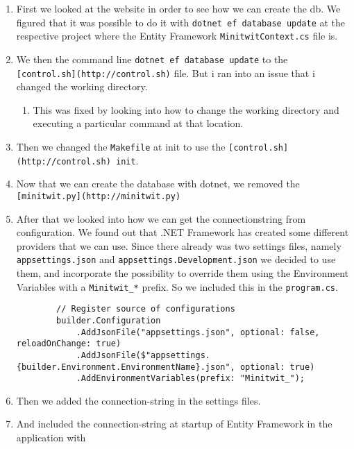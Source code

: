 \begin{enumerate}
    \item First we looked at the website in order to see how we can create the db. We figured that it was possible to do it with \texttt{dotnet\ ef\ database\ update} at the respective project where the Entity Framework \texttt{MinitwitContext.cs} file is.
    \item We then the command line \texttt{dotnet\ ef\ database\ update} to the \texttt{{[}control.sh{]}(http://control.sh)} file. But i ran into an issue that i changed the working directory.

    \begin{enumerate}
        \item This was fixed by looking into how to change the working directory and executing a particular command at that location.
    \end{enumerate}
    \item Then we changed the \texttt{Makefile} at init to use the \texttt{{[}control.sh{]}(http://control.sh)\ init}.
    \item Now that we can create the database with dotnet, we removed the \texttt{{[}minitwit.py{]}(http://minitwit.py)}
    \item After that we looked into how we can get the connectionstring from configuration. We found out that .NET Framework has created some different providers that we can use. Since there already was two settings files, namely \texttt{appsettings.json} and \texttt{appsettings.Development.json} we decided to use them, and incorporate the possibility to override them using the Environment Variables with a \texttt{Minitwit\_*} prefix. So we included this in the \texttt{program.cs}.
    \begin{verbatim}
        // Register source of configurations
        builder.Configuration
            .AddJsonFile("appsettings.json", optional: false, reloadOnChange: true)
            .AddJsonFile($"appsettings.{builder.Environment.EnvironmentName}.json", optional: true)
            .AddEnvironmentVariables(prefix: "Minitwit_");
    \end{verbatim}
    \item Then we added the connection-string in the settings files.
    \item And included the connection-string at startup of Entity Framework in the application with


\end{enumerate}
